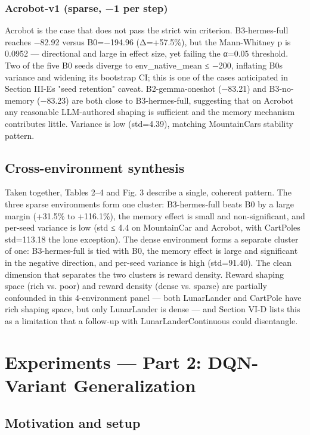 \documentclass[conference,letterpaper,10pt]{IEEEtran}
\begin{document}
\subsubsection{Acrobot-v1 (sparse, −1 per step)}

Acrobot is the case that does not pass the strict win criterion. B3-hermes-full reaches −82.92 versus B0=−194.96 (Δ=+57.5\%), but the Mann-Whitney p is 0.0952 --- directional and large in effect size, yet failing the α=0.05 threshold. Two of the five B0 seeds diverge to env\_native\_mean ≤ −200, inflating B0\textquotesingle s variance and widening its bootstrap CI; this is one of the cases anticipated in Section III-E\textquotesingle s "seed retention" caveat. B2-gemma-oneshot (−83.21) and B3-no-memory (−83.23) are both close to B3-hermes-full, suggesting that on Acrobot any reasonable LLM-authored shaping is sufficient and the memory mechanism contributes little. Variance is low (std=4.39), matching MountainCar\textquotesingle s stability pattern.

\subsection{Cross-environment synthesis}

Taken together, Tables 2--4 and Fig. 3 describe a single, coherent pattern. The three sparse environments form one cluster: B3-hermes-full beats B0 by a large margin (+31.5\% to +116.1\%), the memory effect is small and non-significant, and per-seed variance is low (std ≤ 4.4 on MountainCar and Acrobot, with CartPole\textquotesingle s std=113.18 the lone exception). The dense environment forms a separate cluster of one: B3-hermes-full is tied with B0, the memory effect is large and significant in the negative direction, and per-seed variance is high (std=91.40). The clean dimension that separates the two clusters is reward density. Reward shaping space (rich vs. poor) and reward density (dense vs. sparse) are partially confounded in this 4-environment panel --- both LunarLander and CartPole have rich shaping space, but only LunarLander is dense --- and Section VI-D lists this as a limitation that a follow-up with LunarLanderContinuous could disentangle.


\section{Experiments --- Part 2: DQN-Variant Generalization}

\subsection{Motivation and setup}
\end{document}

